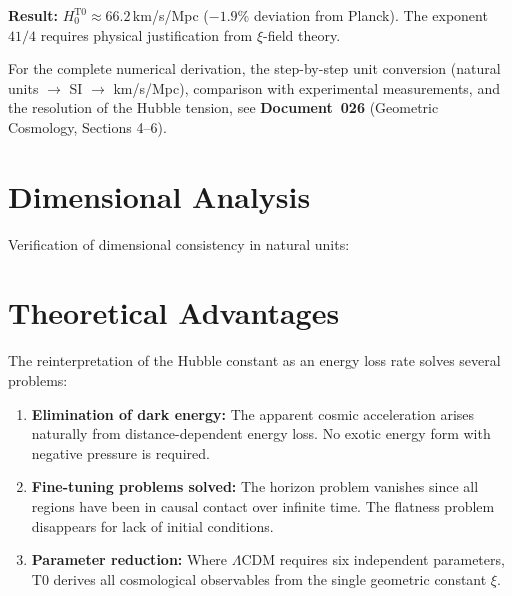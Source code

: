 	\textbf{Result:} $H_0^{\text{T0}} \approx 66.2\,$km/s/Mpc ($-1.9\%$ deviation from Planck). The exponent $41/4$ requires physical justification from $\xi$-field theory.

	For the complete numerical derivation, the step-by-step unit conversion (natural units $\rightarrow$ SI $\rightarrow$ km/s/Mpc), comparison with experimental measurements, and the resolution of the Hubble tension, see \textbf{Document~026} (Geometric Cosmology, Sections 4--6).

\section{Dimensional Analysis}

	Verification of dimensional consistency in natural units:

	\begin{center}
	\end{center}

\section{Theoretical Advantages}

	The reinterpretation of the Hubble constant as an energy loss rate solves several problems:

	\begin{enumerate}
		\item \textbf{Elimination of dark energy:} The apparent cosmic acceleration arises naturally from distance-dependent energy loss. No exotic energy form with negative pressure is required.

		\item \textbf{Fine-tuning problems solved:} The horizon problem vanishes since all regions have been in causal contact over infinite time. The flatness problem disappears for lack of initial conditions.

		\item \textbf{Parameter reduction:} Where $\Lambda$CDM requires six independent parameters, T0 derives all cosmological observables from the single geometric constant $\xi$.
	\end{enumerate}

